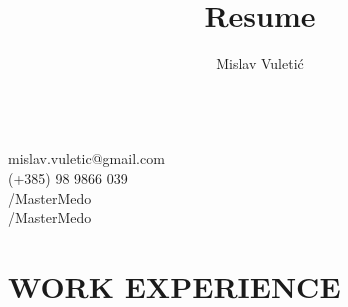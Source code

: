 \documentclass{article}
\begin{document}
\title{Resume}
\author{Mislav Vuletić}

\begin{multicols}{2}
  \fontsize{20}{20}\bfseries
  \theauthor{}

  \fontsize{15}{15}\mdseries
  \mbox{}\\
   mislav.vuletic@gmail.com\\
   (+385) 98 9866 039\\
  /MasterMedo\\
  /MasterMedo
\end{multicols}

\normalsize

\section{WORK EXPERIENCE}
\end{document}
